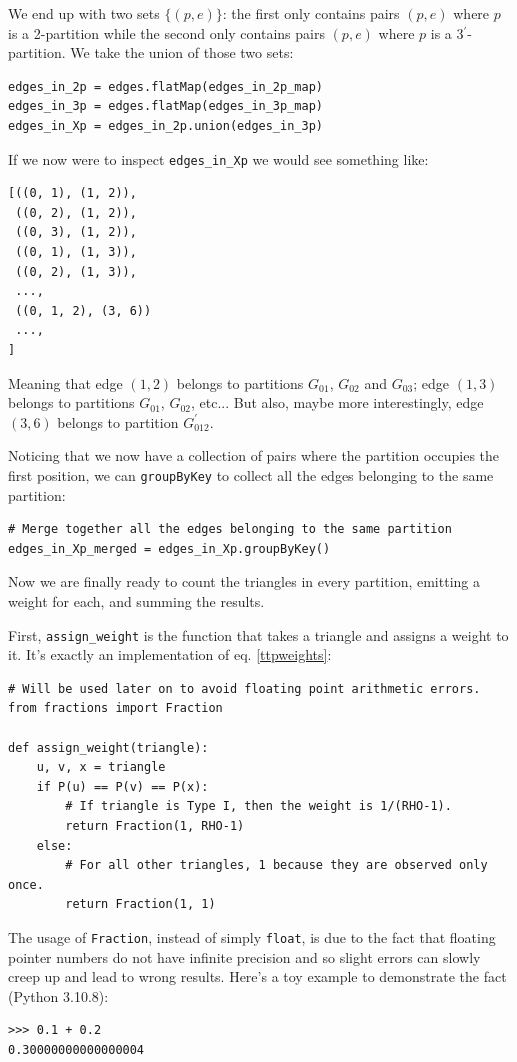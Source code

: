 \documentclass[paper=a4, fontsize=11pt]{scrartcl}
\begin{document}
We end up with two sets $\{(p,e)\}$: the first only contains pairs
$(p,e)$ where $p$ is a 2-partition while the second only contains pairs $(p,e)$
where $p$ is a 3$^\prime$-partition. We take the union of those two sets:
\begin{verbatim}
edges_in_2p = edges.flatMap(edges_in_2p_map)
edges_in_3p = edges.flatMap(edges_in_3p_map)
edges_in_Xp = edges_in_2p.union(edges_in_3p)
\end{verbatim}

If we now were to inspect \texttt{edges_in_Xp} we would see something
like:
\begin{verbatim}
[((0, 1), (1, 2)),
 ((0, 2), (1, 2)),
 ((0, 3), (1, 2)),
 ((0, 1), (1, 3)),
 ((0, 2), (1, 3)),
 ...,
 ((0, 1, 2), (3, 6))
 ...,
]
\end{verbatim}
Meaning that edge $(1,2)$ belongs to partitions $G_{01}$, $G_{02}$ and $G_{03}$;
edge $(1,3)$ belongs to partitions $G_{01}$, $G_{02}$, etc... But also, maybe
more interestingly, edge $(3,6)$ belongs to partition $G^\prime_{012}$.

Noticing that we now have a collection of pairs where the partition occupies the
first position, we can \texttt{groupByKey} to collect all the edges
belonging to the same partition:
\begin{verbatim}
# Merge together all the edges belonging to the same partition
edges_in_Xp_merged = edges_in_Xp.groupByKey()
\end{verbatim}

Now we are finally ready to count the triangles in every partition, emitting a
weight for each, and summing the results.

First, \texttt{assign_weight} is the function that takes a triangle
and assigns a weight to it. It's exactly an implementation of eq.
\ref{ttpweights}:
\begin{verbatim}
# Will be used later on to avoid floating point arithmetic errors.
from fractions import Fraction

def assign_weight(triangle):
    u, v, x = triangle
    if P(u) == P(v) == P(x):
        # If triangle is Type I, then the weight is 1/(RHO-1).
        return Fraction(1, RHO-1)
    else:
        # For all other triangles, 1 because they are observed only once.
        return Fraction(1, 1)
\end{verbatim}

The usage of \texttt{Fraction}, instead of simply
\texttt{float}, is due to the fact that floating pointer numbers do
not have infinite precision and so slight errors can slowly creep up and lead to
wrong results. Here's a toy example to demonstrate the fact (Python 3.10.8):
\begin{verbatim}
>>> 0.1 + 0.2
0.30000000000000004
\end{verbatim}
\end{document}
